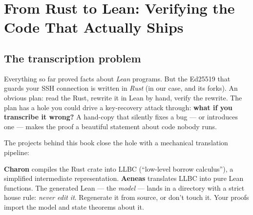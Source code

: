 \chapter{From Rust to Lean: Verifying the Code That Actually Ships}
\label{ch:rust}

\section{The transcription problem}

Everything so far proved facts about \emph{Lean} programs. But the Ed25519
that guards your SSH connection is written in \emph{Rust} (in our case,
 and its forks). An obvious plan: read the Rust,
rewrite it in Lean by hand, verify the rewrite. The plan has a hole you could
drive a key-recovery attack through: \textbf{what if you transcribe it
wrong?} A hand-copy that silently fixes a bug --- or introduces one --- makes
the proof a beautiful statement about code nobody runs.

The projects behind this book close the hole with a mechanical translation
pipeline:

\begin{center}
\end{center}

\textbf{Charon} compiles the Rust crate into LLBC (``low-level borrow
calculus''), a simplified intermediate representation. \textbf{Aeneas}
translates LLBC into pure Lean functions. The generated Lean --- the
\emph{model} --- lands in a  directory with a strict house rule:
\emph{never edit it}. Regenerate it from source, or don't touch it. Your
proofs import the model and state theorems about it.

